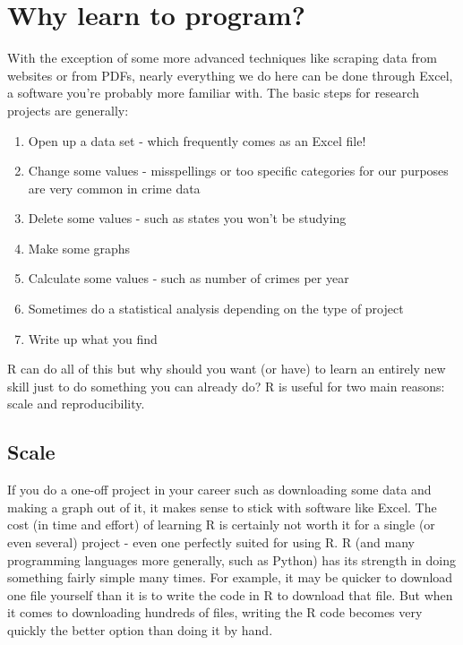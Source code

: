 \documentclass[
]{krantz}
\providecommand{\tightlist}{%
  \setlength{\itemsep}{0pt}\setlength{\parskip}{0pt}}
\begin{document}
\hypertarget{why-learn-to-program}{%
\section*{Why learn to
program?}\label{why-learn-to-program}}


With the exception of some more advanced techniques like
scraping data from websites or from PDFs, nearly everything
we do here can be done through Excel, a software you're
probably more familiar with. The basic steps for research
projects are generally:

\begin{enumerate}
\def\labelenumi{\arabic{enumi}.}
\tightlist
\item
  Open up a data set - which frequently comes as an Excel
  file!
\item
  Change some values - misspellings or too specific
  categories for our purposes are very common in crime data
\item
  Delete some values - such as states you won't be studying
\item
  Make some graphs
\item
  Calculate some values - such as number of crimes per year
\item
  Sometimes do a statistical analysis depending on the type
  of project
\item
  Write up what you find
\end{enumerate}

R can do all of this but why should you want (or have) to
learn an entirely new skill just to do something you can
already do? R is useful for two main reasons: scale and
reproducibility.

\hypertarget{scale}{%
\subsection*{Scale}\label{scale}}


If you do a one-off project in your career such as
downloading some data and making a graph out of it, it makes
sense to stick with software like Excel. The cost (in time
and effort) of learning R is certainly not worth it for a
single (or even several) project - even one perfectly suited
for using R. R (and many programming languages more
generally, such as Python) has its strength in doing
something fairly simple many times. For example, it may be
quicker to download one file yourself than it is to write
the code in R to download that file. But when it comes to
downloading hundreds of files, writing the R code becomes
very quickly the better option than doing it by hand.
\end{document}

